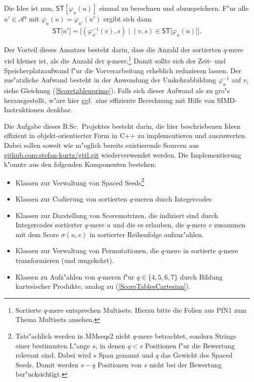 \documentclass[12pt,a4paper]{scrartcl}
\newcommand{\Scoretablename}[0]{\mathsf{ST}}
\newcommand{\Scoretable}[1]{\Scoretablename\lbrack #1\rbrack}
\newcommand{\Permname}[1]{\varphi_{#1}}
\newcommand{\Perm}[2]{\Permname{#1}(#2)}
\newcommand{\Permnameinverse}[1]{\varphi_{#1}^{-1}}
\newcommand{\Perminverse}[2]{\Permnameinverse{#1}(#2)}
\newcommand{\Alpha}[0]{\mathcal{A}}
\begin{document}
Die Idee ist nun, \(\Scoretablename[\Perm{u}{u}]\) einmal zu
berechnen und abzuspeichern. F"ur alle \(u'\in\Alpha^{q}\) mit
\(\Perm{u}{u}=\Perm{u'}{u'}\) ergibt sich dann
\begin{align}
\Scoretable{u'}=\lbrack(\Perminverse{u'}{v},s)\mid (v,s)\in
                          \Scoretable{\Perm{u}{u}}\rbrack.\label{Scoretableuprime}
\end{align}

Der Vorteil dieses Ansatzes besteht darin, dass die Anzahl der sortierten
\(q\)-mere viel kleiner ist, als die
Anzahl der \(q\)-mere.\footnote{Sortierte \(q\)-mere
entsprechen Multisets. Hierzu bitte die Folien aus PfN1 zum
Thema Multisets ansehen.}
Damit sollte sich der Zeit- und
Speicherplatzaufwand f"ur die Vorverarbeitung erheblich reduzieren lassen. Der
zus"atzliche Aufwand besteht in der Anwendung der Umkehrabbildung
\(\Permnameinverse{u}\) auf \(v\), siehe Gleichung
(\ref{Scoretableuprime}). Falls sich dieser Aufwand als
zu gro"s herausgestellt, w"are hier ggf.\ eine effiziente Berechnung mit
Hilfe von SIMD-Instruktionen denkbar.

Die Aufgabe dieses B.Sc.\ Projektes besteht darin, die hier beschriebenen
Ideen effizient in objekt-orientierter Form
in C++ zu implementieren und auszuwerten. Dabei sollen soweit wie m"oglich
bereits existierende Sourcen aus \url{github.com:stefan-kurtz/gttl.git}
wiederverwendet werden. Die Implementierung k"onnte aus den folgenden
Komponenten bestehen:

\begin{itemize}
\item Klassen zur Verwaltung von Spaced Seeds\footnote{Tats"achlich werden in
MMseqs2 nicht \(q\)-mere betrachtet, sondern Strings einer bestimmten
L"ange \(s\), in denen \(q<s\) Positionen f"ur die Bewertung relevant sind.
Dabei wird \(s\) Span genannt und \(q\) das Gewicht des Spaced Seeds.
Damit werden \(s-q\) Positionen von \(s\) nicht bei der Bewertung
ber"ucksichtigt.}
\item
Klassen zur Codierung von sortierten \(q\)-meren durch Integercodes
\item
Klassen zur Darstellung von Scorematrizen, die indiziert sind durch
Integercodes sortierter \(q\)-mere \(u\) und die es erlauben, die
\(q\)-mere \(v\) zusammen mit dem Score \(\sigma(u,v)\) in sortierter
Reihenfolge aufzuz"ahlen.
\item
Klassen zur Verwaltung von Permutationen, die \(q\)-mere in sortierte
\(q\)-mere transformieren (und umgekehrt).
\item
Klassen zu Aufz"ahlen von \(q\)-meren f"ur \(q\in \{4,5,6,7\}\) durch
Bildung kartesischer Produkte, analog zu (\ref{ScoreTablesCartesian}).
\end{itemize}
\end{document}
